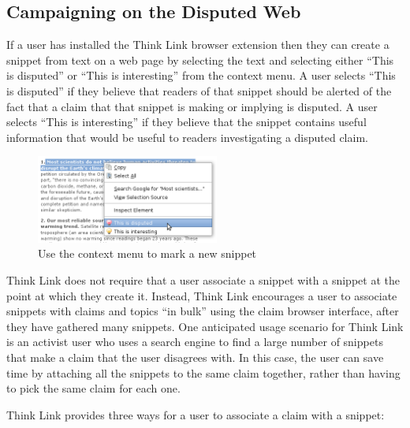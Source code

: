 \documentclass{chi2009}
\begin{document}
\subsection{Campaigning on the Disputed Web}

If a user has installed the Think Link browser extension then they can create a snippet from text on a web page by selecting the text and selecting either ``This is disputed'' or ``This is interesting'' from the context menu. A user selects ``This is disputed'' if they believe that readers of that snippet should be alerted of the fact that a claim that that snippet is making or implying is disputed. A user selects ``This is interesting'' if they believe that the snippet contains useful information that would be useful to readers investigating a disputed claim. 

\begin{figure}[tb]
	\begin{center}
	\includegraphics[width=6cm]{../screenshots/v2_snipmark.png}
	\caption{Use the context menu to mark a new snippet}
	\label{createprocess}
	\end{center}
\end{figure}

Think Link does not require that a user associate a snippet with a snippet at the point at which they create it. Instead, Think Link encourages a user to associate snippets with claims and topics ``in bulk'' using the claim browser interface, after they have gathered many snippets. 
One anticipated usage scenario for Think Link is an activist user who uses a search engine to find a large number of snippets that make a claim that the user disagrees with.  %
In this case, the user can save time by attaching all the snippets to the same claim together, rather than having to pick the same claim for each one.

Think Link provides three ways for a user to associate a claim with a snippet:
\end{document}
